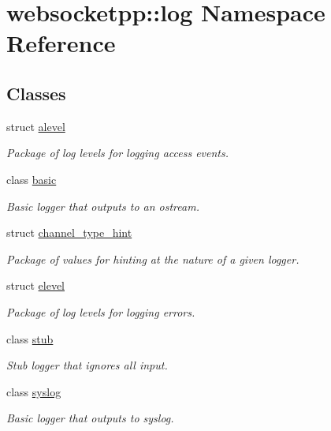 \hypertarget{namespacewebsocketpp_1_1log}{}\section{websocketpp\+:\+:log Namespace Reference}
\label{namespacewebsocketpp_1_1log}
\subsection*{Classes}
\begin{DoxyCompactItemize}
\item 
struct \hyperlink{structwebsocketpp_1_1log_1_1alevel}{alevel}
\begin{DoxyCompactList}\small\item\em Package of log levels for logging access events. \end{DoxyCompactList}\item 
class \hyperlink{classwebsocketpp_1_1log_1_1basic}{basic}
\begin{DoxyCompactList}\small\item\em Basic logger that outputs to an ostream. \end{DoxyCompactList}\item 
struct \hyperlink{structwebsocketpp_1_1log_1_1channel__type__hint}{channel\+\_\+type\+\_\+hint}
\begin{DoxyCompactList}\small\item\em Package of values for hinting at the nature of a given logger. \end{DoxyCompactList}\item 
struct \hyperlink{structwebsocketpp_1_1log_1_1elevel}{elevel}
\begin{DoxyCompactList}\small\item\em Package of log levels for logging errors. \end{DoxyCompactList}\item 
class \hyperlink{classwebsocketpp_1_1log_1_1stub}{stub}
\begin{DoxyCompactList}\small\item\em Stub logger that ignores all input. \end{DoxyCompactList}\item 
class \hyperlink{classwebsocketpp_1_1log_1_1syslog}{syslog}
\begin{DoxyCompactList}\small\item\em Basic logger that outputs to syslog. \end{DoxyCompactList}\end{DoxyCompactItemize}
